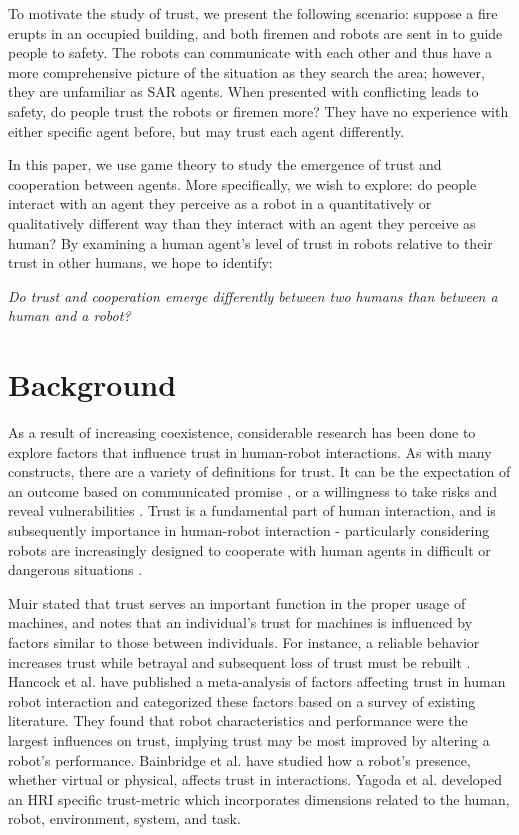 \documentclass{sig-alternate}
\begin{document}
To motivate the study of trust, we present the following scenario: suppose a fire erupts in an occupied building, and both firemen and robots are sent in to guide people to safety. The robots can communicate with each other and thus have a more comprehensive picture of the situation as they search the area; however, they are unfamiliar as SAR agents. When presented with conflicting leads to safety, do people trust the robots or firemen more? They have no experience with either specific agent before, but may trust each agent differently.

In this paper, we use game theory to study the emergence of trust and cooperation between agents. More specifically, we wish to explore: do people interact with an agent they perceive as a robot in a quantitatively or qualitatively different way than they interact with an agent they perceive as human? By examining a human agent's level of trust in robots relative to their trust in other humans, we hope to identify:

\indent \textit{Do trust and cooperation emerge differently between two humans than between a human and a robot?}\\

\section{Background}
As a result of increasing coexistence, considerable research has been done to explore factors that influence trust in human-robot interactions. As with many constructs, there are a variety of definitions for trust. It can be the expectation of an outcome based on communicated promise \cite{rotter1967new}, or a willingness to take risks and reveal vulnerabilities \cite{lee2004trust}. Trust is a fundamental part of human interaction, and is subsequently importance in human-robot interaction - particularly considering robots are increasingly designed to cooperate with human agents in difficult or dangerous situations \cite{casper2003human}.

Muir stated that trust serves an important function in the proper usage of machines, and notes that an individual's trust for machines is influenced by factors similar to those between individuals. For instance, a reliable behavior increases trust while betrayal and subsequent loss of trust must be rebuilt \cite{muir1987trust}. Hancock et al. \cite{hancock2011meta} have published a meta-analysis of factors affecting trust in human robot interaction and categorized these factors based on a survey of existing literature. They found that robot characteristics and performance were the largest influences on trust, implying trust may be most improved by altering a robot's performance. Bainbridge et al. \cite{bainbridge2008effect} have studied how a robot's presence, whether virtual or physical, affects trust in interactions. Yagoda et al. \cite{yagoda2012you} developed an HRI specific trust-metric which incorporates dimensions related to the human, robot, environment, system, and task. 
\end{document}

